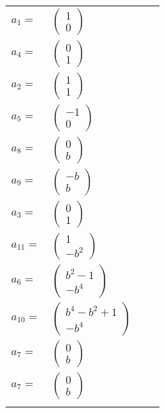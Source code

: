 \documentclass[1p]{elsarticle_modified}
\theoremstyle{definition}
\begin{document}
\begin{tabular}{m{7pt} m{180pt} m{7pt} m{180pt} }
\flushright $a_{1}=$&$\begin{pmatrix}1\\0\end{pmatrix}$ \\
\flushright $a_{4}=$&$\begin{pmatrix}0\\1\end{pmatrix}$ \\
\flushright $a_{2}=$&$\begin{pmatrix}1\\1\end{pmatrix}$ \\
\flushright $a_{5}=$&$\begin{pmatrix}-1\\0\end{pmatrix}$ \\
\flushright $a_{8}=$&$\begin{pmatrix}0\\b\end{pmatrix}$ \\
\flushright $a_{9}=$&$\begin{pmatrix}- b\\b\end{pmatrix}$ \\
\flushright $a_{3}=$&$\begin{pmatrix}0\\1\end{pmatrix}$ \\
\flushright $a_{11}=$&$\begin{pmatrix}1\\- b^2\end{pmatrix}$ \\
\flushright $a_{6}=$&$\begin{pmatrix}b^2-1\\- b^4\end{pmatrix}$ \\
\flushright $a_{10}=$&$\begin{pmatrix}b^4- b^2+1\\- b^4\end{pmatrix}$ \\
\flushright $a_{7}=$&$\begin{pmatrix}0\\b\end{pmatrix}$\\ \flushright $a_{7}=$&$\begin{pmatrix}0\\b\end{pmatrix}$\\&\end{tabular}
\end{document}

